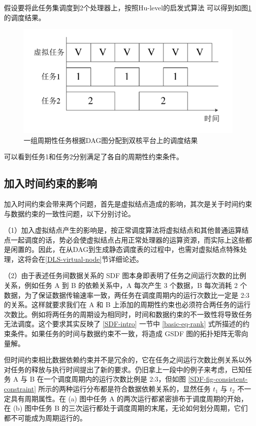 假设要将此任务集调度到2个处理器上，按照Hu-level的启发式算法 可以得到如图\ref{SDF-fig-sch} 的调度结果。

\begin{figure}[!htb]
  \centering
  \includegraphics[height=20ex]{figure/SDF-3-sch.pdf}
  \caption{一组周期性任务根据DAG图分配到双核平台上的调度结果}
  \label{SDF-fig-sch}
\end{figure}

可以看到任务1和任务2分别满足了各自的周期性约束条件。

\subsection{加入时间约束的影响}
\label{SDF-time-constraint-influence}

加入时间约束会带来两个问题，首先是虚拟结点造成的影响，其次是关于时间约束与数据约束的一致性问题，以下分别讨论。

（1）加入虚拟结点产生的影响是，按正常调度算法将虚拟结点和其他普通运算结点一起调度的话，势必会使虚拟结点占用正常处理器的运算资源，而实际上这些都是闲置的。因此，在从DAG到生成静态调度表的过程中，也需对虚拟结点特殊处理，这将会在\ref{DLS-virtual-node}节详细论述。

（2）由于表述任务间数据关系的 SDF 图本身即表明了任务之间运行次数的比例关系，例如任务 A 到 B 的依赖关系中，A 每次产生 3 个数据，B 每次消耗 2 个数据，为了保证数据传输速率一致，两任务在调度周期内的运行次数比一定是 2:3 的关系。这样就要求我们在 A 和 B 上添加的周期性约束也必须符合两任务的运行次数比。例如将两任务的周期设为相同时，时间和数据约束的不一致性将导致任务无法调度。这个要求其实反映了 \ref{SDF-intro} 一节中 \eqref{basic-eq-rank} 式所描述的约束条件。如果任务的时间与数据约束不一致，将造成 GSDF 图的拓扑矩阵无零向量解。

但时间约束相比数据依赖约束并不是冗余的，它在任务之间运行次数比例关系以外对任务的释放与执行时间提出了新的要求。仍旧拿上一段中的例子来考虑，已知任务 A 与 B 在一个调度周期内的运行次数比例是 2:3，但如图 \ref{SDF-fig-consistent-constraint} 所示的两种运行分布都是符合数据依赖关系的，显然任务 $t_1$ 与 $t_2$ 不一定具有周期属性。在 (a) 图中任务 A 的两次运行都紧密排布于调度周期的开始，在 (b) 图中任务 B 的三次运行都处于调度周期的末尾，无论如何划分周期，它们都不可能成为周期运行的。

